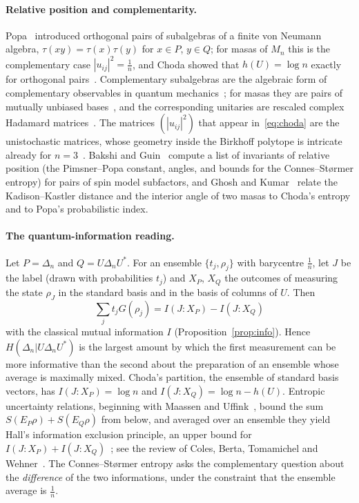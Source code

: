 \documentclass[11pt]{article}
\theoremstyle{plain}
\theoremstyle{definition}
\theoremstyle{remark}
\begin{document}
\paragraph{Relative position and complementarity.} Popa~\cite{popa1983} introduced orthogonal pairs of subalgebras of a
finite von Neumann algebra, $\tau(xy)=\tau(x)\tau(y)$ for $x\in P$, $y\in Q$; for masas of $M_n$ this is the complementary
case $|u_{ij}|^2=\frac1n$, and Choda showed that $h(U)=\log n$ exactly for orthogonal pairs~\cite{choda}.
Complementary subalgebras are the algebraic form of complementary observables in quantum mechanics~\cite{petz2007}; for
masas they are pairs of mutually unbiased bases~\cite{wootters1989,durt2010}, and the corresponding unitaries are rescaled
complex Hadamard matrices~\cite{tadej2006}. The matrices $(|u_{ij}|^2)$ that appear in~\eqref{eq:choda} are the unistochastic
matrices, whose geometry inside the Birkhoff polytope is intricate already for $n=3$~\cite{bengtsson2005}. Bakshi and
Guin~\cite{bakshi} compute a list of invariants of relative position (the Pimsner--Popa constant, angles, and bounds for the
Connes--St{\o}rmer entropy) for pairs of spin model subfactors, and Ghosh and Kumar~\cite{ghosh2026} relate the
Kadison--Kastler distance and the interior angle of two masas to Choda's entropy and to Popa's probabilistic index.

\paragraph{The quantum-information reading.} Let $P=\Delta_n$ and $Q=U\Delta_nU^*$. For an ensemble $\{t_j,\rho_j\}$ with
barycentre $\frac1n$, let $J$ be the label (drawn with probabilities $t_j$) and $X_P$, $X_Q$ the outcomes of measuring the
state $\rho_J$ in the standard basis and in the basis of columns of $U$. Then
\[
  \sum_jt_jG(\rho_j)=I(J:X_P)-I(J:X_Q)
\]
with the classical mutual information $I$ (Proposition~\ref{prop:info}). Hence $H(\Delta_n|U\Delta_nU^*)$ is the largest
amount by which the first measurement can be more informative than the second about the preparation of an ensemble whose
average is maximally mixed. Choda's partition, the ensemble of standard basis vectors, has $I(J:X_P)=\log n$ and
$I(J:X_Q)=\log n-h(U)$. Entropic uncertainty relations, beginning with Maassen and Uffink~\cite{maassen1988}, bound the
sum $S(E_P\rho)+S(E_Q\rho)$ from below, and averaged over an ensemble they yield Hall's information exclusion principle,
an upper bound for $I(J:X_P)+I(J:X_Q)$~\cite{hall1995}; see the review of Coles, Berta, Tomamichel and
Wehner~\cite{coles2017}. The Connes--St{\o}rmer entropy asks the complementary question about the \emph{difference} of the
two informations, under the constraint that the ensemble average is $\frac1n$.
\end{document}
